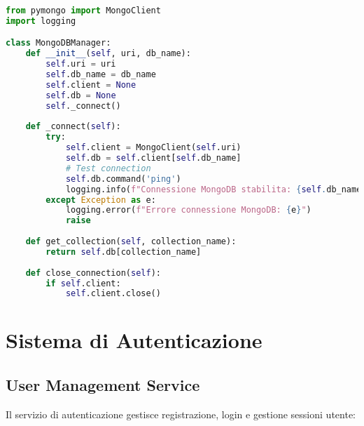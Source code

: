 \documentclass[12pt,a4paper]{report}
\begin{document}
\begin{lstlisting}[language=Python, caption=MongoDB Manager]
from pymongo import MongoClient
import logging

class MongoDBManager:
    def __init__(self, uri, db_name):
        self.uri = uri
        self.db_name = db_name
        self.client = None
        self.db = None
        self._connect()
    
    def _connect(self):
        try:
            self.client = MongoClient(self.uri)
            self.db = self.client[self.db_name]
            # Test connection
            self.db.command('ping')
            logging.info(f"Connessione MongoDB stabilita: {self.db_name}")
        except Exception as e:
            logging.error(f"Errore connessione MongoDB: {e}")
            raise
    
    def get_collection(self, collection_name):
        return self.db[collection_name]
    
    def close_connection(self):
        if self.client:
            self.client.close()
\end{lstlisting}

\section{Sistema di Autenticazione}

\subsection{User Management Service}

Il servizio di autenticazione gestisce registrazione, login e gestione sessioni utente:
\end{document}
